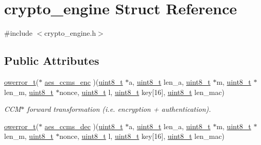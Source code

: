 \hypertarget{structcrypto__engine}{}\section{crypto\+\_\+engine Struct Reference}
\label{structcrypto__engine}


{\ttfamily \#include $<$crypto\+\_\+engine.\+h$>$}

\subsection*{Public Attributes}
\begin{DoxyCompactItemize}
\item 
\hyperlink{opendefs_8h_af20b7c3ed9d2ba19e56a309ad9314803}{owerror\+\_\+t}($\ast$ \hyperlink{structcrypto__engine_a12a8a9acc25e34a417ae9cfbc4b2ed6e}{aes\+\_\+ccms\+\_\+enc} )(\hyperlink{_p_e___types_8h_aba7bc1797add20fe3efdf37ced1182c5}{uint8\+\_\+t} $\ast$a, \hyperlink{_p_e___types_8h_aba7bc1797add20fe3efdf37ced1182c5}{uint8\+\_\+t} len\+\_\+a, \hyperlink{_p_e___types_8h_aba7bc1797add20fe3efdf37ced1182c5}{uint8\+\_\+t} $\ast$m, \hyperlink{_p_e___types_8h_aba7bc1797add20fe3efdf37ced1182c5}{uint8\+\_\+t} $\ast$len\+\_\+m, \hyperlink{_p_e___types_8h_aba7bc1797add20fe3efdf37ced1182c5}{uint8\+\_\+t} $\ast$nonce, \hyperlink{_p_e___types_8h_aba7bc1797add20fe3efdf37ced1182c5}{uint8\+\_\+t} l, \hyperlink{_p_e___types_8h_aba7bc1797add20fe3efdf37ced1182c5}{uint8\+\_\+t} key\mbox{[}16\mbox{]}, \hyperlink{_p_e___types_8h_aba7bc1797add20fe3efdf37ced1182c5}{uint8\+\_\+t} len\+\_\+mac)
\begin{DoxyCompactList}\small\item\em C\+C\+M$\ast$ forward transformation (i.\+e. encryption + authentication). \end{DoxyCompactList}\item 
\hyperlink{opendefs_8h_af20b7c3ed9d2ba19e56a309ad9314803}{owerror\+\_\+t}($\ast$ \hyperlink{structcrypto__engine_acb65b7e80080ea988ffde3b19bc6e716}{aes\+\_\+ccms\+\_\+dec} )(\hyperlink{_p_e___types_8h_aba7bc1797add20fe3efdf37ced1182c5}{uint8\+\_\+t} $\ast$a, \hyperlink{_p_e___types_8h_aba7bc1797add20fe3efdf37ced1182c5}{uint8\+\_\+t} len\+\_\+a, \hyperlink{_p_e___types_8h_aba7bc1797add20fe3efdf37ced1182c5}{uint8\+\_\+t} $\ast$m, \hyperlink{_p_e___types_8h_aba7bc1797add20fe3efdf37ced1182c5}{uint8\+\_\+t} $\ast$len\+\_\+m, \hyperlink{_p_e___types_8h_aba7bc1797add20fe3efdf37ced1182c5}{uint8\+\_\+t} $\ast$nonce, \hyperlink{_p_e___types_8h_aba7bc1797add20fe3efdf37ced1182c5}{uint8\+\_\+t} l, \hyperlink{_p_e___types_8h_aba7bc1797add20fe3efdf37ced1182c5}{uint8\+\_\+t} key\mbox{[}16\mbox{]}, \hyperlink{_p_e___types_8h_aba7bc1797add20fe3efdf37ced1182c5}{uint8\+\_\+t} len\+\_\+mac)

\end{DoxyCompactItemize}
